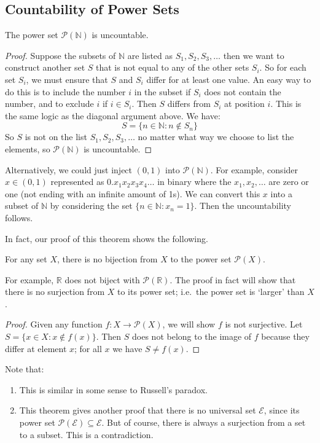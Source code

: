 \subsection{Countability of Power Sets}
\begin{theorem}
	The power set \(\mathcal P(\mathbb N)\) is uncountable.
\end{theorem}
\begin{proof}
	Suppose the subsets of \(\mathbb N\) are listed as \(S_1, S_2, S_3, \dots\) then we want to construct another set \(S\) that is not equal to any of the other sets \(S_i\).
	So for each set \(S_i\), we must ensure that \(S\) and \(S_i\) differ for at least one value.
	An easy way to do this is to include the number \(i\) in the subset if \(S_i\) does not contain the number, and to exclude \(i\) if \(i \in S_i\).
	Then \(S\) differs from \(S_i\) at position \(i\).
	This is the same logic as the diagonal argument above.
	We have:
	\[
		S = \{ n \in \mathbb N : n \notin S_n \}
	\]
	So \(S\) is not on the list \(S_1, S_2, S_3, \dots\) no matter what way we choose to list the elements, so \(\mathcal P(\mathbb N)\) is uncountable.
\end{proof}
\begin{remark}
	Alternatively, we could just inject \((0, 1)\) into \(\mathcal P(\mathbb N)\).
	For example, consider \(x \in (0, 1)\) represented as \(0.x_1x_2x_3x_4\dots\) in binary where the \(x_1, x_2, \dots\) are zero or one (not ending with an infinite amount of 1s).
	We can convert this \(x\) into a subset of \(\mathbb N\) by considering the set \(\{ n \in \mathbb N : x_n = 1 \}\).
	Then the uncountability follows.
\end{remark}
In fact, our proof of this theorem shows the following.
\begin{theorem}
	For any set \(X\), there is no bijection from \(X\) to the power set \(\mathcal P(X)\).
\end{theorem}
For example, \(\mathbb R\) does not biject with \(\mathcal P(\mathbb R)\).
The proof in fact will show that there is no surjection from \(X\) to its power set; i.e.\ the power set is `larger' than \(X\).
\begin{proof}
	Given any function \(f\colon X \to \mathcal P(X)\), we will show \(f\) is not surjective.
	Let \(S = \{ x \in X: x \notin f(x) \}\).
	Then \(S\) does not belong to the image of \(f\) because they differ at element \(x\); for all \(x\) we have \(S \neq f(x)\).
\end{proof}
\begin{remark}
	Note that:
	\begin{enumerate}
		\item This is similar in some sense to Russell's paradox.
		\item This theorem gives another proof that there is no universal set \(\mathscr E\), since its power set \(\mathcal P(\mathscr E) \subseteq \mathscr E\).
		      But of course, there is always a surjection from a set to a subset.
		      This is a contradiction.
	\end{enumerate}
\end{remark}

